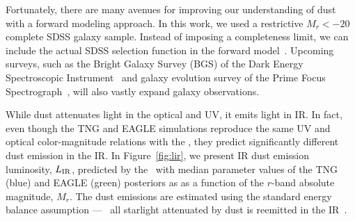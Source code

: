 Fortunately, there are many avenues for improving our understanding of dust
with a forward modeling approach. In this work, we used a restrictive $M_r <
-20$ complete SDSS galaxy sample. 
Instead of imposing a completeness limit, 
we can include the actual SDSS selection function in the forward 
model~\citep[\eg~][]{dickey2020}. 
Upcoming surveys, such as the Bright Galaxy Survey (BGS) of the Dark Energy
Spectroscopic Instrument~\citep[DESI;][]{desicollaboration2016, ruiz-macias2020} 
and galaxy evolution survey of the Prime Focus
Spectrograph~\citep[PFS;][]{takada2014,tamura2016}, will also vastly expand galaxy
observations. 

While dust attenuates light in the optical and UV, it emits light in
IR. In fact, even though the TNG and EAGLE simulations reproduce the same UV and
optical color-magnitude relations with the \eda, they predict significantly 
different dust emission in the IR. In Figure~\ref{fig:lir}, we present IR dust
emission luminosity, $L_{\rm IR}$, predicted by the \eda~with median parameter values of 
the TNG (blue) and EAGLE (green) posteriors as as a function of the $r$-band 
absolute magnitude, $M_r$. The dust emissions are estimated using the standard
energy balance assumption --- \ie~all starlight attenuated by dust is reemitted 
in the IR~\citep{dacunha2008}. 

